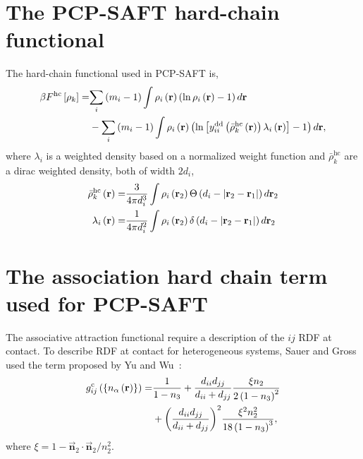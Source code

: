 \documentclass[12pt, letterpaper]{article}
\newcommand*{\vc}[1]{\vec{\mathbf{#1}}}%
\newcommand*{\abs}[1]{\lvert#1\rvert}
\newcommand*{\lb}{\ensuremath{\left(}}
\newcommand*{\rb}{\ensuremath{\right)}}
\newcommand*{\lbf}{\ensuremath{\left[}}
\newcommand*{\rbf}{\ensuremath{\right]}}
\newcommand{\contact}{\ensuremath{\text{c}}\xspace}
\newcommand{\hc}{\ensuremath{\text{hc}}\xspace}
\begin{document}
\section{The PCP-SAFT hard-chain functional}
The hard-chain functional used in PCP-SAFT \cite{sauer2017} is,
\begin{equation}
  \label{eq:hc_functional}
  \begin{split}
    \beta F^\hc\lbf \rho_{k} \rbf =& \underset{i}{\sum} \lb m_i - 1 \rb \int \rho_{i}\lb \mathbf{r}\rb \lb \ln \rho_{i}\lb \mathbf{r}\rb -1 \rb d\mathbf{r}\\
    & -\underset{i}{\sum} \lb m_i - 1 \rb \int \rho_{i}\lb \mathbf{r}\rb \lb \ln \lbf y_{ii}^{\text{dd}}\lb \bar{\rho}^\hc_{k}\lb\mathbf{r}\rb\rb\lambda_i\lb \mathbf{r} \rb\rbf -1 \rb d\mathbf{r},
    \end{split}
\end{equation}
where $\lambda_i$ is a weighted density based on a normalized weight
function and $\bar{\rho}^\hc_{k}$ are a dirac weighted density, both
of width $2 d_i$,
\begin{align}
  \label{eq:hc_densities}
  \bar{\rho}^\hc_{k}\lb\mathbf{r}\rb =& \frac{3}{4\pi d_i^3} \int \rho_{i}\lb \mathbf{r}_2\rb \Theta \lb d_i - \abs{\mathbf{r}_2 - \mathbf{r}_1}\rb d\mathbf{r}_2 \\
  \lambda_i\lb \mathbf{r} \rb  =& \frac{1}{4 \pi d_i^2} \int \rho_{i}\lb \mathbf{r}_2\rb \delta \lb d_i - \abs{\mathbf{r}_2 - \mathbf{r}_1}\rb d\mathbf{r}_2
\end{align}


\section{The association hard chain term used for PCP-SAFT}
The associative attraction functional require a description of the
$ij$ RDF at contact. To describe RDF at contact for heterogeneous
systems, Sauer and Gross used the term proposed by Yu and
Wu~\cite{yu2002}:
\begin{equation}
  \begin{split}
    g^{\contact}_{ij}\left(\left\{n_\alpha\left(\mathbf{r}\right)\right\}\right) =& \frac{1}{1- n_3} + \frac{d_{ii}d_{jj}}{d_{ii} + d_{jj}} \frac{\xi n_2}{2\lb 1- n_3 \rb^2} \\
                                                                                &+ \biggl(\frac{d_{ii}d_{jj}}{d_{ii} + d_{jj}} \biggr)^2\frac{\xi^2n_2^2}{18\lb 1- n_3 \rb^3},
  \end{split}
\end{equation}
where $\xi = 1 - \vc{n}_2 \cdot \vc{n}_2 / n_2^2$.
\end{document}
